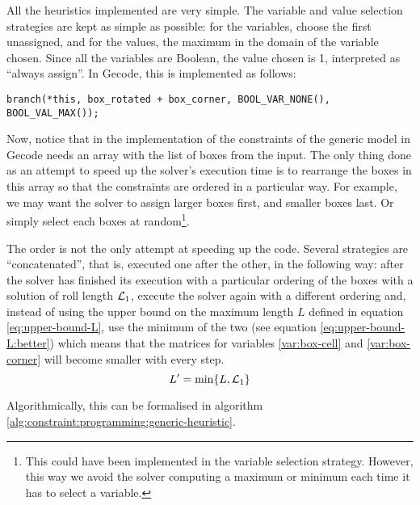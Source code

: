 \hfill

All the heuristics implemented are very simple. The variable and value selection
strategies are kept as simple as possible: for the variables, choose the first
unassigned, and for the values, the maximum in the domain of the variable chosen.
Since all the variables are Boolean, the value chosen is 1, interpreted as ``always
assign''. In Gecode, this is implemented as follows:

{\NOINDENT \begin{lstlisting}
branch(*this, box_rotated + box_corner, BOOL_VAR_NONE(), BOOL_VAL_MAX());
\end{lstlisting}}

Now, notice that in the implementation of the constraints of the generic model
in Gecode needs an array with the list of boxes from the input. The only thing
done as an attempt to speed up the solver's execution time is to rearrange
the boxes in this array so that the constraints are ordered in a particular way.
For example, we may want the solver to assign larger boxes first, and smaller boxes
last. Or simply select each boxes at random\footnote{ This could have been implemented
in the variable selection strategy. However, this way we avoid the solver computing
a maximum or minimum each time it has to select a variable.}.

\hfill

The order is not the only attempt at speeding up the code. Several strategies are
``concatenated'', that is, executed one after the other, in the following way:
after the solver has finished its execution with a particular ordering of the boxes
with a solution of roll length $\mathcal{L}_1$, execute the solver again with a
different ordering and, instead of using the upper bound on the maximum length
$L$ defined in equation \ref{eq:upper-bound-L}, use the minimum of the two (see
equation \ref{eq:upper-bound-L:better}) which means that the matrices for variables
\ref{var:box-cell} and \ref{var:box-corner} will become smaller with every step.
\begin{equation}
\label{eq:upper-bound-L:better}
L' = \min\{L, \mathcal{L}_1\}
\end{equation}

Algorithmically, this can be formalised in algorithm \ref{alg:constraint:programming:generic-heuristic}.

\hfill

